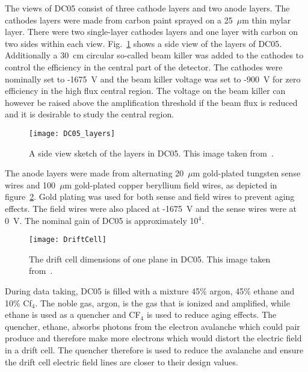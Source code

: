 The views of DC05 consist of three cathode layers and two anode layers.  The
cathodes layers were made from carbon paint sprayed on a 25~$\mu$m thin mylar
layer.  There were two single-layer cathodes layers and one layer with carbon on
two sides within each view.  Fig.~\ref{fig::DC05_layers} shows a side view of
the layers of DC05.  Additionally a 30~cm circular so-called beam killer was
added to the cathodes to control the efficiency in the central part of the
detector.  The cathodes were nominally set to -1675~V and the beam killer
voltage was set to -900~V for zero efficiency in the high flux central region.
The voltage on the beam killer can however be raised above the amplification
threshold if the beam flux is reduced and it is desirable to study the central
region.

\begin{figure}[h!t]
  \centering \texttt{[image: DC05\_layers]}
  \caption{A side view sketch of the layers in DC05.  This image taken
    from~\cite{heitzDC05DNP}.}
  \label{fig::DC05_layers}
\end{figure}

The anode layers were made from alternating 20~$\mu$m gold-plated tungsten sense
wires and 100~$\mu$m gold-plated copper beryllium field wires, as depicted in
figure~\ref{fig:driftcell}.  Gold plating was used for both sense and field
wires to prevent aging effects.  The field wires were also placed at -1675~V and
the sense wires were at 0~V.  The nominal gain of DC05 is approximately 10$^4$.

\begin{figure}
  \centering \texttt{[image: DriftCell]}
  \caption{}{The drift cell dimensions of one plane in DC05.  This image taken
    from~\cite{heitzDC05DNP}.}
  \label{fig:driftcell}%
\end{figure}

During data taking, DC05 is filled with a mixture 45\% argon, 45\% ethane and
10\% Cf$_4$.  The noble gas, argon, is the gas that is ionized and amplified,
while ethane is used as a quencher and CF$_4$ is used to reduce aging effects.
The quencher, ethane, absorbs photons from the electron avalanche which could
pair produce and therefore make more electrons which would distort the electric
field in a drift cell.  The quencher therefore is used to reduce the avalanche
and ensure the drift cell electric field lines are closer to their design
values.


